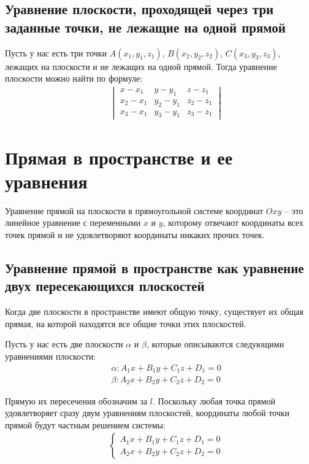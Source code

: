 \documentclass[12pt, fleqn]{extarticle}
\begin{document}
\subsection*{Уравнение плоскости, проходящей через три заданные точки, не лежащие на одной прямой}
Пусть у нас есть три точки \(A(x_1, y_1, z_1)\), \(B(x_2, y_2, z_2)\), \(C(x_3, y_3, z_3)\), лежащих на плоскости и не лежащих на одной прямой. Тогда уравнение плоскости можно найти по формуле:
\begin{align*}
     &  &
    \begin{vmatrix}
        x - x_1   & y - y_1   & z - z_1   \\
        x_2 - x_1 & y_2 - y_1 & z_2 - z_1 \\
        x_3 - x_1 & y_3 - y_1 & z_3 - z_1
    \end{vmatrix}
\end{align*}


\newpage

\section{Прямая в пространстве и ее уравнения}\label{sec:line_in_space}
Уравнение прямой на плоскости в прямоугольной системе координат \(Oxy\) – это линейное уравнение с переменными \(x\) и \(y\), которому отвечают координаты всех точек прямой и не удовлетворяют координаты никаких прочих точек.

\subsection*{Уравнение прямой в пространстве как уравнение двух пересекающихся плоскостей}
Когда две плоскости в пространстве имеют общую точку, существует их общая прямая, на которой находятся все общие точки этих плоскостей.

Пусть у нас есть две плоскости \(\alpha\) и \(\beta\), которые описываются следующими уравнениями плоскости:
\begin{align*}
     &  &
    \alpha: A_1x + B_1y + C_1z + D_1 = 0 \\
     &  &
    \beta: A_2x + B_2y + C_2z + D_2 = 0
\end{align*}

Прямую их пересечения обозначим за \(l\). Поскольку любая точка прямой удовлетворяет сразу двум уравнениям плоскостей, координаты любой точки прямой будут частным решением системы:
\begin{align*}
     &  &
    \begin{cases}
        A_1x + B_1y + C_1z + D_1 = 0 \\
        A_2x + B_2y + C_2z + D_2 = 0
    \end{cases}
\end{align*}
\end{document}
